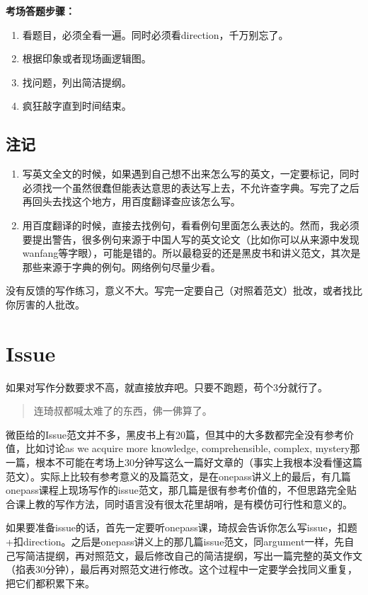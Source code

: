 \documentclass[cn,plain]{./src/qyxfbook}
\begin{document}
\textbf{考场答题步骤：}
\begin{enumerate}
    \item 看题目，必须全看一遍。同时必须看direction，千万别忘了。
    \item 根据印象或者现场画逻辑图。
    \item 找问题，列出简洁提纲。
    \item 疯狂敲字直到时间结束。
\end{enumerate}

\subsection{注记}
\begin{enumerate}
    \item 写英文全文的时候，如果遇到自己想不出来怎么写的英文，一定要标记，同时必须找一个虽然很蠢但能表达意思的表达写上去，不允许查字典。写完了之后再回头去找这个地方，用百度翻译查应该怎么写。
    \item 用百度翻译的时候，直接去找例句，看看例句里面怎么表达的。然而，我必须要提出警告，很多例句来源于中国人写的英文论文（比如你可以从来源中发现wanfang等字眼），可能是错的。所以最稳妥的还是黑皮书和讲义范文，其次是那些来源于字典的例句。网络例句尽量少看。
\end{enumerate}

没有反馈的写作练习，意义不大。写完一定要自己（对照着范文）批改，或者找比你厉害的人批改。

\section{Issue}
如果对写作分数要求不高，就直接放弃吧。只要不跑题，苟个3分就行了。

\begin{quote}
连琦叔都喊太难了的东西，佛一佛算了。
\end{quote}

微臣给的Issue范文并不多，黑皮书上有20篇，但其中的大多数都完全没有参考价值，比如讨论as
we acquire more knowledge, comprehensible, complex,
mystery那一篇，根本不可能在考场上30分钟写这么一篇好文章的（事实上我根本没看懂这篇范文）。实际上比较有参考意义的及篇范文，是在onepass讲义上的最后，有几篇onepass课程上现场写作的issue范文，那几篇是很有参考价值的，不但思路完全贴合课上教的写作方法，同时语言没有很太花里胡哨，是有模仿可行性和意义的。

如果要准备issue的话，首先一定要听onepass课，琦叔会告诉你怎么写issue，扣题+扣direction。之后是onepass讲义上的那几篇issue范文，同argument一样，先自己写简洁提纲，再对照范文，最后修改自己的简洁提纲，写出一篇完整的英文作文（掐表30分钟），最后再对照范文进行修改。这个过程中一定要学会找同义重复，把它们都积累下来。
\end{document}
